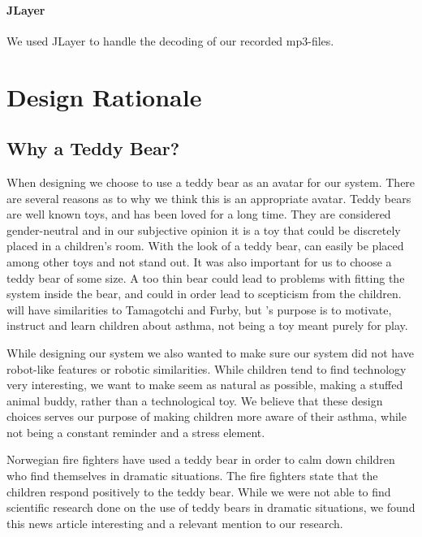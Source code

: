 \paragraph{JLayer}
We used JLayer to handle the decoding of our recorded mp3-files. 

\section{Design Rationale}
\subsection{Why a Teddy Bear?}
When designing \buddy{} we choose to use a teddy bear as an avatar for our system. There are several reasons as to why we think this is an appropriate avatar. Teddy bears are well known toys, and has been loved for a long time. They are considered gender-neutral\cite{stagnitti1997determining}\cite{cherney2006gender} and in our subjective opinion it is a toy that could be discretely placed in a children's room. With the look of a teddy bear, \buddy{} can easily be placed among other toys and not stand out. It was also important for us to choose a teddy bear of some size. A too thin bear could lead to problems with fitting the system inside the bear, and could in order lead to scepticism from the children. \buddy{} will have similarities to Tamagotchi\cite{tamagotchi} and Furby\cite{furby}, but \buddy{}'s purpose is to motivate, instruct and learn children about asthma, not being a toy meant purely for play. 

While designing our system we also wanted to make sure our system did not have robot-like features or robotic similarities. While children tend to find technology very interesting, we want to make \buddy{} seem as natural as possible, making a stuffed animal buddy, rather than a technological toy. We believe that these design choices serves our purpose of making children more aware of their asthma, while not being a constant reminder and a stress element. 

Norwegian fire fighters have used a teddy bear in order to calm down children who find themselves in dramatic situations. The fire fighters state that the children respond positively to the teddy bear. 
While we were not able to find scientific research done on the use of teddy bears in dramatic situations, we found this news article interesting and a relevant mention to our research. 

